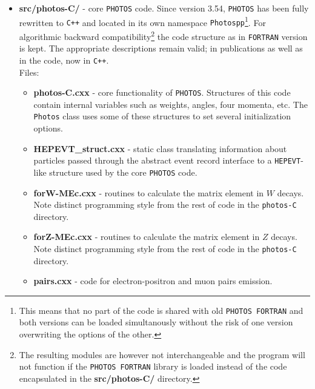 \documentclass[]{Photos_interface_design}
\begin{document}
\begin{itemize}
\item {\bf  src/photos-C/ } - core {\tt PHOTOS} code. Since version 3.54, {\tt PHOTOS} has been
      fully rewritten to {\tt C++} and located in its own namespace {\tt Photospp}\footnote{This means that no part of
      the code is shared with old {\tt PHOTOS FORTRAN} and both versions can be loaded simultanously without the
      risk of one version overwriting the options of the other.}. For algorithmic backward
 compatibility\footnote{The resulting modules are however not interchangeable and the program
 will not function if the {\tt PHOTOS FORTRAN} library is loaded instead of the code encapsulated 
in the {\bf src/photos-C/ } directory.
}
 the code structure as in {\tt FORTRAN} version is kept. The appropriate descriptions remain valid;
in publications as well as in the code, now in {\tt C++}. \\
  Files:
  \begin{itemize}
    \item { \bf photos-C.cxx } - core functionality of {\tt PHOTOS}. Structures of this code contain internal variables such as weights, angles, four momenta, etc.
                                 The {\tt Photos} class uses some of these structures to set several initialization options.
    \item { \bf HEPEVT\_struct.cxx } - static class translating information about particles passed through the abstract event record interface
                                       to a {\tt HEPEVT}-like structure used by the core {\tt PHOTOS} code.
    \item { \bf forW-MEc.cxx } - routines to calculate the matrix element in $W$ decays. 
                                 Note distinct programming style from the rest of code in the {\tt photos-C} directory.
    \item { \bf forZ-MEc.cxx } - routines to calculate the matrix element in $Z$ decays. 
                                 Note distinct programming style from the rest of code in the {\tt photos-C} directory.
    \item { \bf pairs.cxx } - code for electron-positron and muon pairs emission.
    \end{itemize}



\end{itemize}
\end{document}
